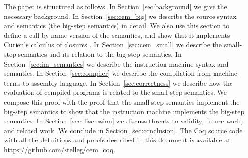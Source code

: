 The paper is structured as follows. In Section~\ref{sec:background} we give the
necessary background. In Section~\ref{sec:cem_big} we describe the source syntax
and semantics (the big-step \ce semantics) in detail.  We also use
this section to define a call-by-name version of the semantics, and
show that it implements Curien's calculus of closures \cite{curien1991abstract}.  In
Section~\ref{sec:cem_small} we describe the small-step \ce semantics
and its relation to the big-step semantics. In Section~\ref{sec:im_semantics}
we describe the instruction machine syntax and semantics. In
Section~\ref{sec:compiler} we describe the compilation from machine terms to
assembly language. In Section~\ref{sec:correctness} we describe how the evaluation
of compiled programs is related to the small-step \ce semantics. We
compose this proof with the proof that the small-step semantics implement the
big-step semantics to show that the instruction machine implements the big-step
semantics. In Section~\ref{sec:discussion} we discuss threats to validity,
future work, and related work. We conclude in Section~\ref{sec:conclusion}. The
Coq source code with all the definitions and proofs described in this document
is available at \url{https://github.com/stelleg/cem\_coq}. 

